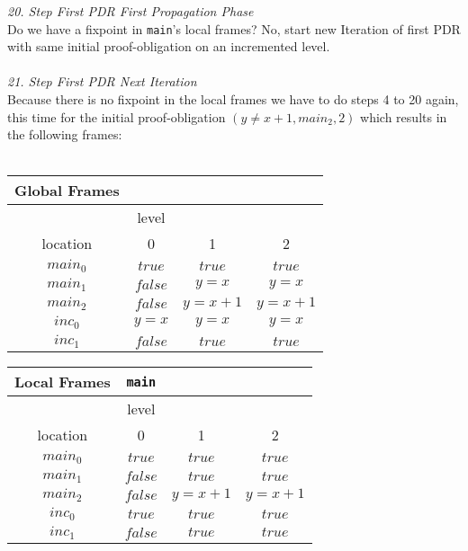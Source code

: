 \documentclass{article}
\begin{document}
\textsl{20. Step First PDR First Propagation Phase} \\
Do we have a fixpoint in \texttt{main}'s local frames? No, start new Iteration of first PDR with same initial proof-obligation on an incremented level. \\ \\

\textsl{21. Step First PDR Next Iteration} \\
Because there is no fixpoint in the local frames we have to do steps 4 to 20 again, this time for the initial proof-obligation $(y \neq x + 1, main_2, 2)$ which results in the following frames: \\ \\

	\begin{minipage}{.5\textwidth}
	\setlength\tabcolsep{0.35em}
	\begin{center}
		\begin{tabu}{cccc}
			Global Frames \\
			\toprule
			& level \\
			\cmidrule(lr){2-4}
			location & 0 & 1 & 2 \\
			$main_0$ & $true$ & $true$ & $true$  \\
			$main_1$ & $false$ & $y = x$ & $y = x$\\
			$main_2$ & $false$ & $y = x + 1$ & $y = x + 1$ \\
			$inc_0$ & $y = x$ & $y = x$ & $y = x$ \\
			$inc_1$ & $false$ & $true$ & $true$\\
			\bottomrule
		\end{tabu}
	\end{center}
\end{minipage}
\hfill
\begin{minipage}{.4\textwidth}
	\setlength\tabcolsep{0.35em}
	\begin{center}
		\begin{tabu}{cccc}
			Local Frames & \texttt{main}\\
			\toprule
			& level \\
			\cmidrule(lr){2-4}
			location & 0 & 1 & 2\\
			$main_0$ & $true$ & $true$ & $true$\\
			$main_1$ & $false$ & $true$ & $true$\\
			$main_2$ & $false$ & $y = x + 1$ & $y = x + 1$\\
			$inc_0$ & $true$ & $true$ & $true$\\
			$inc_1$ & $false$ & $true$ & $true$\\
			\bottomrule
		\end{tabu}
	\end{center}	
\end{minipage}
\end{document}
